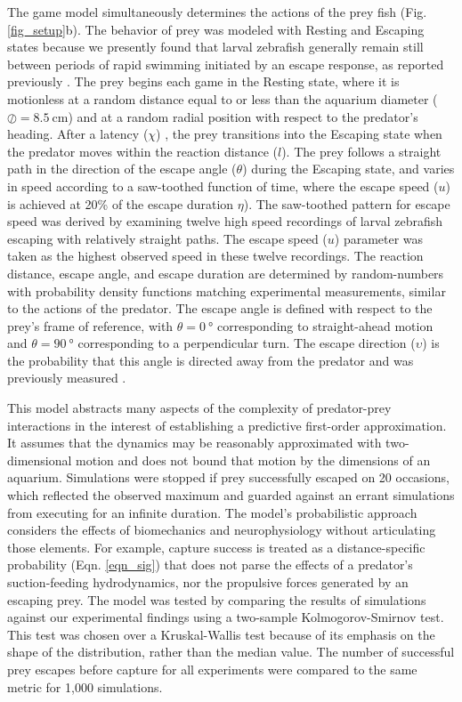 \documentclass[]{rsos}%
\begin{document}
The game model simultaneously determines the actions of the prey fish (Fig. \ref{fig_setup}b).
The behavior of prey was modeled with Resting and Escaping states because we presently found that larval zebrafish generally remain still between periods of rapid swimming initiated by an escape response, as reported previously \cite{Stewart:2013bha, Stewart:2014cma}. 
The prey begins each game in the Resting state, where it is motionless at a random distance equal to or less than the aquarium diameter ($\oslash = \SI{8.5}{\cm}$) and at a random radial position with respect to the predator's heading.
After a latency ($\chi$) \cite{Nair:2015gk}, the prey transitions into the Escaping state when the predator moves within the reaction distance ($l$).
The prey follows a straight path in the direction of the escape angle ($\theta$) during the Escaping state, and varies in speed according to a saw-toothed function of time, where the escape speed ($u$) is achieved at 20\% of the escape duration $\eta$). 
The saw-toothed pattern for escape speed was derived by examining twelve high speed recordings of larval zebrafish escaping with relatively straight paths.
The escape speed ($u$) parameter  was taken as the highest observed speed in these twelve recordings.
The reaction distance, escape angle, and escape duration are determined by random-numbers with probability density functions matching experimental measurements, similar to the actions of the predator.
The escape angle is defined with respect to the prey's frame of reference, with $\theta =  \SI{0}{\degree}$ corresponding to straight-ahead motion and $\theta = \SI{90}{\degree}$ corresponding to a perpendicular turn.
The escape direction ($\upsilon$) is the probability that this angle is directed away from the predator and was previously measured \cite{Stewart:2014cma}.

This model abstracts many aspects of the complexity of predator-prey interactions in the interest of establishing a predictive first-order approximation.
It assumes that the dynamics may be reasonably approximated with two-dimensional motion and does not bound that motion by the dimensions of an aquarium. 
Simulations were stopped if prey successfully escaped on 20 occasions, which reflected the observed maximum and guarded against an errant simulations from executing for an infinite duration.
The model's probabilistic approach considers the effects of biomechanics and neurophysiology without articulating those elements.
For example, capture success is treated as a distance-specific probability (Eqn. \ref{eqn_sig}) that does not parse the effects of a predator's suction-feeding hydrodynamics, nor the propulsive forces generated by an escaping prey.
The model was tested by comparing the results of simulations against our experimental findings using a two-sample Kolmogorov-Smirnov test. 
This test was chosen over a Kruskal-Wallis test because of its emphasis on the shape of the distribution, rather than the median value.  
The number of successful prey escapes before capture for all experiments were compared to the same metric for 1,000 simulations.  
\end{document}
